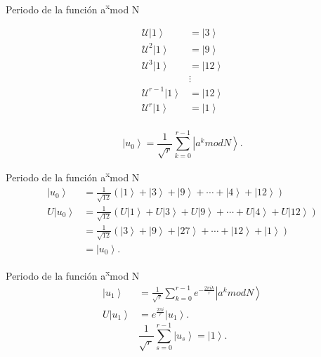 \begin{frame}{Periodo de la función a\textsuperscript{x}mod N}
    \begin{minipage}{0.49\linewidth}
    \begin{align*}
    \mathcal{U}\left| 1 \right\rangle &= \left|3\right\rangle \\
    \mathcal{U}^2\left| 1 \right\rangle &= \left|9\right\rangle \\
    \mathcal{U}^3\left| 1 \right\rangle &= \left|12\right\rangle \\ 
                   & \vdots  \\ 
    \mathcal{U}^{r-1}\left| 1 \right\rangle &= \left|12\right\rangle \\
    \mathcal{U}^r\left| 1 \right\rangle &= \left|1\right\rangle \\
\end{align*}
    \end{minipage}
    \begin{minipage}{0.49\linewidth}
    \begin{equation}
    \left| u_0 \right\rangle = \frac{1}{\sqrt{r}} \sum\limits_{k=0}^{r-1} \left|a^k mod N \right\rangle.
    \label{eq:u0}
\end{equation}
    \end{minipage}
\end{frame}
\begin{frame}{Periodo de la función a\textsuperscript{x}mod N}
    \begin{align*}
    \left| u_0 \right\rangle &= \frac{1}{\sqrt{12}} \left(\left|1\right\rangle + \left|3\right\rangle+ \left|9\right\rangle 
    +\cdots +\left|4\right\rangle + \left|12\right\rangle \right)\\
    U\left| u_0 \right\rangle &= \frac{1}{\sqrt{12}} \left(U\left|1\right\rangle + U\left|3\right\rangle+ U\left|9\right\rangle 
    +\cdots +U\left|4\right\rangle + U\left|12\right\rangle \right)\\
    &= \frac{1}{\sqrt{12}} \left(\left|3\right\rangle + \left|9\right\rangle+ \left|27\right\rangle 
    +\cdots +\left|12\right\rangle + \left|1\right\rangle \right)\\
    &= \left| u_0 \right\rangle .
\end{align*}
\end{frame}
\begin{frame}{Periodo de la función a\textsuperscript{x}mod N}
\begin{align*}
    \left| u_1 \right\rangle &= \frac{1}{\sqrt{r}} \sum\limits_{k=0}^{r-1} e^{-\frac{2\pi i k}{r}} \left| a^k mod N \right\rangle \\
    U\left| u_1 \right\rangle &= e^{\frac{2\pi i}{r}} \left| u_1 \right\rangle.
\end{align*}
\begin{equation*}
    \frac{1}{\sqrt{r}} \sum\limits_{s=0}^{r-1} \left|u_s \right\rangle =  \left| 1 \right\rangle.
\end{equation*}
\end{frame}
